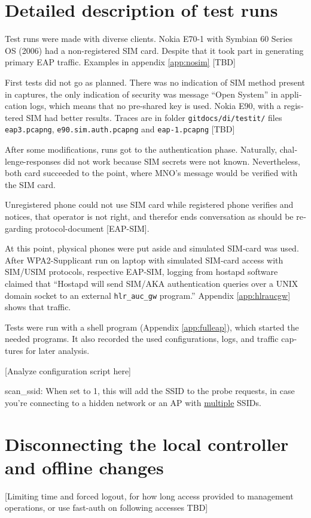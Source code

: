 \documentclass[12pt,a4paper,english]{tutthesis}
\begin{document}
\begin{otherlanguage}{english}
\section{Detailed description of test runs}
\label{sec-5-2}






Test runs were made with diverse clients.
Nokia E70-1 with Symbian 60 Series OS (2006) had a
non-registered SIM card. Despite that it took part in generating
primary EAP traffic.
Examples in appendix \ref{app:nosim}   [TBD]

First tests 
did not go as planned. There was no indication of SIM method
present in captures, the only indication of security was message
``Open System'' in application logs, which means that no pre-shared
key is used.
Nokia E90, with a registered SIM had better results. Traces
are in folder \verb~gitdocs/di/testit/~ files \verb~eap3.pcapng~,
  \verb~e90.sim.auth.pcapng~ and \verb~eap-1.pcapng~  [TBD]

After some modifications, runs got to the authentication phase.
Naturally, challenge-responses did not work because SIM secrets were
not known. Nevertheless, both card succeeded to the point, where MNO's
message would be verified with the SIM card.

Unregistered phone could not use SIM card while 
registered phone verifies and notices, that operator is not right, 
and therefor ends conversation as should be regarding protocol-document [EAP-SIM].

At this point, physical phones were put aside and simulated SIM-card
was used.
After WPA2-Supplicant run on laptop with simulated SIM-card access 
with SIM/USIM protocols, respective EAP-SIM, logging 
from hostapd software claimed that ``Hostapd will send SIM/AKA authentication
queries over a UNIX domain socket to an external \verb~hlr_auc_gw~ program.''
Appendix \ref{app:hlraucgw}   shows that traffic.

Tests were run with a shell program (Appendix \ref{app:fulleap}), which
started the needed programs. It also recorded the used configurations, logs,
and traffic captures for later analysis.

[Analyze configuration script here]

scan\_ssid: When set to 1, this will add the SSID to the probe
requests, in case you're connecting to a hidden network or an AP with
\uline{multiple} SSIDs.

\section{Disconnecting the local controller and offline changes}
\label{sec-5-3}
\label{sec:disconnections}
[Limiting time and forced logout, for how long access provided to
management operations, or use fast-auth on following accesses TBD]


\end{otherlanguage}
\end{document}
